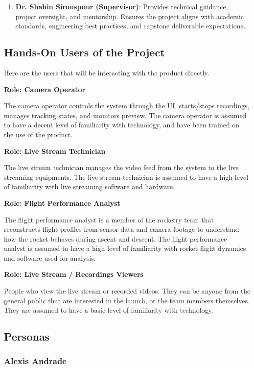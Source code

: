 \documentclass[12pt]{article}
\begin{document}
\begin{enumerate}
  \item \textbf{Dr. Shahin Sirouspour (Supervisor)}: Provides
        technical guidance, project oversight, and mentorship. Ensures
        the project aligns with academic standards, engineering best
        practices, and capstone deliverable expectations.
\end{enumerate}

\subsection{Hands-On Users of the Project}

Here are the users that will be interacting with the product directly.

\textbf{Role: Camera Operator}

The camera operator controls the system through the UI, starts/stops
recordings, manages tracking states, and monitors preview. The camera operator
is assumed to have a decent level of familiarity with technology, and have been
trained on the use of the product.

\textbf{Role: Live Stream Technician}

The live stream technician manages the video feed from the system to the live
streaming equipments. The live stream technician is assumed to have a high
level of familiarity with live streaming software and hardware.

\textbf{Role: Flight Performance Analyst}

The flight performance analyst is a member of the rocketry team that
reconstructs flight profiles from sensor data and camera footage to understand
how the rocket behaves during ascent and descent. The flight performance
analyst is assumed to have a high level of familiarity with rocket flight
dynamics and software used for analysis.

\textbf{Role: Live Stream / Recordings Viewers}

People who view the live stream or recorded videos. They can be anyone from the
general public that are interested in the launch, or the team members
themselves. They are assumed to have a basic level of familiarity with
technology.

\subsection{Personas}

\subsubsection*{Alexis Andrade}
\end{document}
